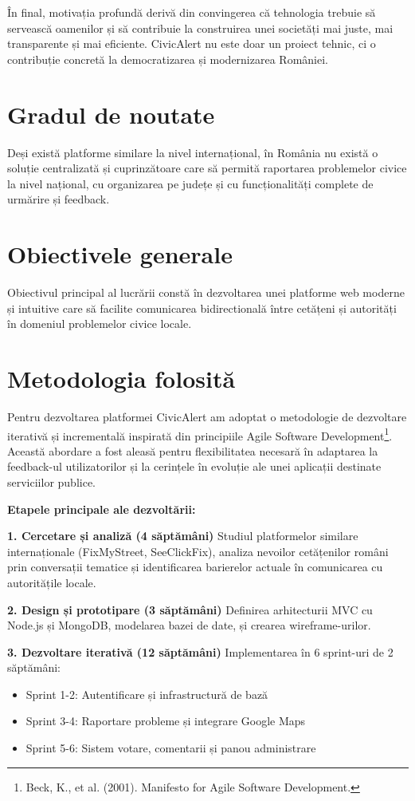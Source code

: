\documentclass[12pt,a4paper]{report}
\begin{document}
În final, motivația profundă derivă din convingerea că tehnologia trebuie să servească oamenilor și să contribuie la construirea unei societăți mai juste, mai transparente și mai eficiente. CivicAlert nu este doar un proiect tehnic, ci o contribuție concretă la democratizarea și modernizarea României.
\section*{Gradul de noutate}

Deși există platforme similare la nivel internațional, în România nu există o soluție centralizată și cuprinzătoare care să permită raportarea problemelor civice la nivel național, cu organizarea pe județe și cu funcționalități complete de urmărire și feedback.

\section*{Obiectivele generale}

Obiectivul principal al lucrării constă în dezvoltarea unei platforme web moderne și intuitive care să facilite comunicarea bidirectională între cetățeni și autorități în domeniul problemelor civice locale.

\section*{Metodologia folosită}

Pentru dezvoltarea platformei CivicAlert am adoptat o metodologie de dezvoltare iterativă și incrementală  inspirată din principiile Agile Software Development\footnote{Beck, K., et al. (2001). Manifesto for Agile Software Development.}. Această abordare a fost aleasă pentru flexibilitatea necesară în adaptarea la feedback-ul utilizatorilor și la cerințele în evoluție ale unei aplicații destinate serviciilor publice.

\textbf{Etapele principale ale dezvoltării:}

\textbf{1. Cercetare și analiză (4 săptămâni)}
Studiul platformelor similare internaționale (FixMyStreet, SeeClickFix), analiza nevoilor cetățenilor români prin conversații tematice și identificarea barierelor actuale în comunicarea cu autoritățile locale.

\textbf{2. Design și prototipare (3 săptămâni)}
Definirea arhitecturii MVC cu Node.js și MongoDB, modelarea bazei de date, și crearea wireframe-urilor.

\textbf{3. Dezvoltare iterativă (12 săptămâni)}
Implementarea în 6 sprint-uri de 2 săptămâni:
\begin{itemize}
\item Sprint 1-2: Autentificare și infrastructură de bază
\item Sprint 3-4: Raportare probleme și integrare Google Maps
\item Sprint 5-6: Sistem votare, comentarii și panou administrare
\end{itemize}
\end{document}
